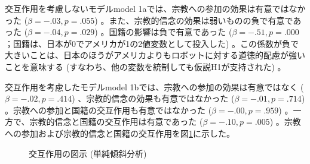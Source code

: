 \documentclass[a4j,12pt]{jreport}
\begin{document}
交互作用を考慮しないモデルmodel 1aでは、宗教への参加の効果は有意ではなかった ($\beta = -.03, p = .055$) 。また、宗教的信念の効果は弱いものの負で有意であった ($\beta = -.04, p = .029$) 。国籍の影響は負で有意であった ($\beta = -.51, p = .000$；国籍は、日本が0でアメリカが1の2値変数として投入した) 。この係数が負で大きいことは、日本のほうがアメリカよりもロボットに対する道徳的配慮が強いことを意味する (すなわち、他の変数を統制しても仮説H1が支持された) 。


交互作用を考慮したモデルmodel 1bでは、宗教への参加の効果は有意ではなく ($\beta = -.02, p = .414$) 、宗教的信念の効果も有意ではなかった ($\beta = -.01, p = .714$) 。宗教への参加と国籍の交互作用も有意ではなかった ($\beta = -.00, p = .959$) 。一方で、宗教的信念と国籍の交互作用は有意であった ($\beta = -.10, p = .005$) 。宗教への参加および宗教的信念と国籍の交互作用を図\ref{fig:shayko}に示した。

\begin{figure}[H]
  \centering
{}%
          \label{ra}
%
          \label{sbs}
           \caption{交互作用の図示 (単純傾斜分析) }
           \label{fig:shayko}
       
\end{figure}
\end{document}
